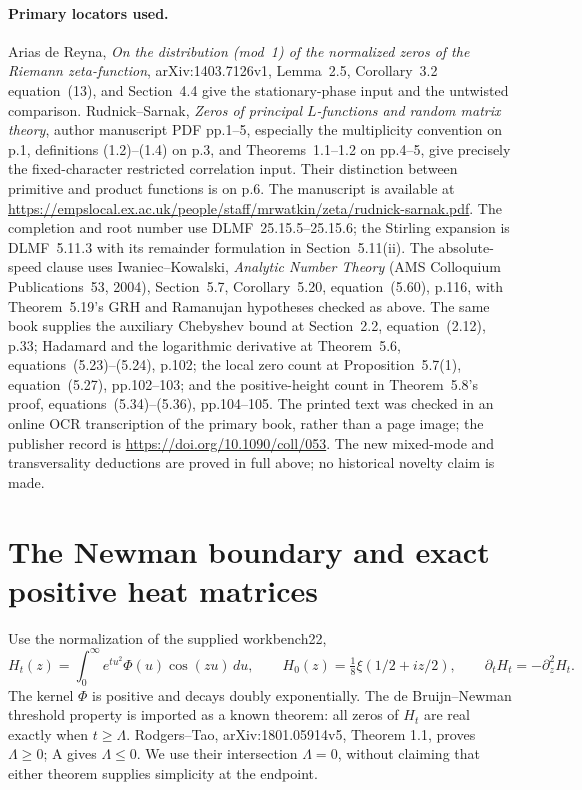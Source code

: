 \paragraph{Primary locators used.}
Arias de Reyna, \emph{On the distribution (mod~1) of the normalized
zeros of the Riemann zeta-function}, arXiv:1403.7126v1,
Lemma~2.5, Corollary~3.2 equation~(13), and Section~4.4 give the
stationary-phase input and the untwisted comparison.
Rudnick--Sarnak, \emph{Zeros of principal $L$-functions and random
matrix theory}, author manuscript PDF pp.1--5, especially the
multiplicity convention on p.1, definitions (1.2)--(1.4) on p.3,
and Theorems~1.1--1.2 on pp.4--5, give precisely the fixed-character
restricted correlation input. Their distinction between primitive
and product functions is on p.6. The manuscript is available at
\url{https://empslocal.ex.ac.uk/people/staff/mrwatkin/zeta/rudnick-sarnak.pdf}.
The completion and root number use DLMF~25.15.5--25.15.6; the
Stirling expansion is DLMF~5.11.3 with its remainder formulation
in Section~5.11(ii). The absolute-speed clause uses
Iwaniec--Kowalski, \emph{Analytic Number Theory} (AMS Colloquium
Publications~53, 2004), Section~5.7, Corollary~5.20, equation~(5.60),
p.116, with Theorem~5.19's GRH and Ramanujan hypotheses checked
as above. The same book supplies the auxiliary Chebyshev bound at
Section~2.2, equation~(2.12), p.33; Hadamard and the logarithmic
derivative at Theorem~5.6, equations~(5.23)--(5.24), p.102; the
local zero count at Proposition~5.7(1), equation~(5.27), pp.102--103;
and the positive-height count in Theorem~5.8's proof,
equations~(5.34)--(5.36), pp.104--105.
The printed text was checked in an online OCR transcription
of the primary book, rather than a page image; the publisher record
is \url{https://doi.org/10.1090/coll/053}.
The new mixed-mode and transversality deductions
are proved in full above; no historical novelty claim is made.


\section{The Newman boundary and exact positive heat matrices}

Use the normalization of the supplied workbench22,
\[
 H_t(z)=\int_0^\infty e^{tu^2}\Phi(u)\cos(zu)\,du,
 \qquad H_0(z)=\tfrac18\xi(1/2+iz/2),
 \qquad \partial_tH_t=-\partial_z^2H_t.
\]
The kernel $\Phi$ is positive and decays doubly exponentially. The
de Bruijn--Newman threshold property is imported as a known theorem:
all zeros of $H_t$ are real exactly when $t\ge\Lambda$. Rodgers--Tao,
arXiv:1801.05914v5, Theorem 1.1, proves $\Lambda\ge0$; A gives
$\Lambda\le0$. We use their intersection $\Lambda=0$, without claiming
that either theorem supplies simplicity at the endpoint.

